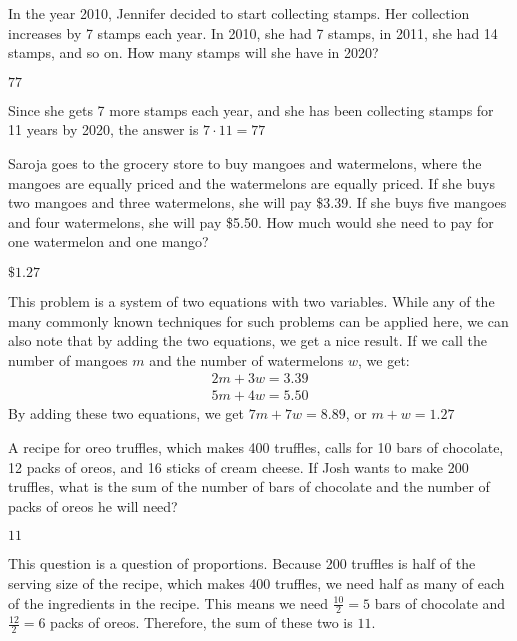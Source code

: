 \documentclass[11pt]{article}
\begin{document}
\begin{problem}
In the year 2010, Jennifer decided to start collecting stamps. Her collection increases by 7 stamps each year. In 2010, she had 7 stamps, in 2011, she had 14 stamps, and so on. How many stamps will she have in 2020?
\end{problem}
\begin{answer}
$\boxed{77}$
\end{answer}
\begin{solution}
Since she gets 7 more stamps each year, and she has been collecting stamps for 11 years by 2020, the answer is $7 \cdot 11 = \boxed{77}$
\end{solution}

\begin{problem}Saroja goes to the grocery store to buy mangoes and watermelons, where the mangoes are equally priced and the watermelons are equally priced. If she buys two mangoes and three watermelons, she will pay \$3.39. If she buys five mangoes and four watermelons, she will pay \$5.50. How much would she need to pay for one watermelon and one mango?
\end{problem}
\begin{answer}
$\boxed{\$1.27}$
\end{answer}
\begin{solution} This problem is a system of two equations with two variables. While any of the many commonly known techniques for such problems can be applied here, we can also note that by adding the two equations, we get a nice result. If we call the number of mangoes $m$ and the number of watermelons $w$, we get:
\begin{align*}
2m + 3w = 3.39\\
5m + 4w = 5.50
\end{align*}
By adding these two equations, we get $7m + 7w = 8.89$, or $m+w = \boxed{1.27}$
\end{solution}

\begin{problem} A recipe for oreo truffles, which makes 400 truffles, calls for 10 bars of chocolate, 12 packs of oreos, and 16 sticks of cream cheese. If Josh wants to make 200 truffles, what is the sum of the number of bars of chocolate and the number of packs of oreos he will need?
\end{problem}
\begin{answer}
$\boxed{11}$
\end{answer}
\begin{solution}This question is a question of proportions. Because 200 truffles is half of the serving size of the recipe, which makes 400 truffles, we need half as many of each of the ingredients in the recipe. This means we need $\frac{10}{2} = 5$ bars of chocolate and $\frac{12}{2} = 6$ packs of oreos. Therefore, the sum of these two is $\boxed{11}$.
\end{solution}
\end{document}
